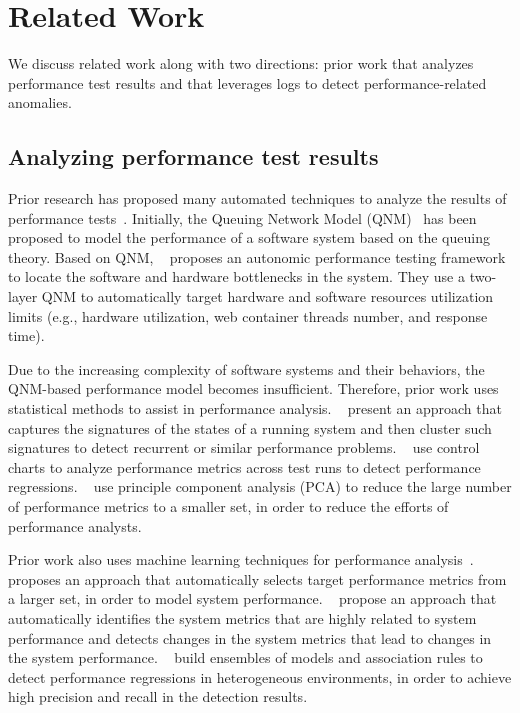 \section{Related Work} \label{sec:relatedwork}
We discuss related work along with two directions: prior work that analyzes performance test results and that leverages logs to detect performance-related anomalies.

\subsection{Analyzing performance test results}
Prior research has proposed many automated techniques to analyze the results of performance tests~\citep{DBLP:conf/icst/GaoJBL16,DBLP:journals/tse/JiangH15}.
Initially, the Queuing Network Model (QNM)~\citep{DBLP:books/daglib/0076254} has been proposed to model the performance of a software system based on the queuing theory. 
Based on QNM, ~\citet{DBLP:conf/icac/BarnaLG11} proposes an autonomic performance testing framework to locate the software and hardware bottlenecks in the system. They use a two-layer QNM to automatically target hardware and software resources utilization limits (e.g., hardware utilization, web container threads number, and response time). 

Due to the increasing complexity of software systems and their behaviors, the QNM-based performance model becomes insufficient.
Therefore, prior work uses statistical methods to assist in performance analysis.
~\citet{DBLP:conf/sosp/CohenZGSKF05} present an approach that captures the signatures of the states of a running system and then cluster such signatures to detect recurrent or similar performance problems. 
~\citet{DBLP:conf/apsec/NguyenAJHNF11,DBLP:conf/wosp/NguyenAJHNF12} use control charts to analyze performance metrics across test runs to detect performance regressions.
~\citet{DBLP:conf/csmr/MalikJAHFH10,DBLP:conf/icse/MalikHH13} use principle component analysis (PCA) to reduce the large number of performance metrics to a smaller set, in order to reduce the efforts of performance analysts.

Prior work also uses machine learning techniques for performance analysis~\citep{DBLP:conf/wosp/ShangHNF15,DBLP:conf/wosp/XiongPZG13,Foo:2015:ICS:2819009.2819034,DBLP:conf/icdm/LimLZFTLDZ14,DBLP:conf/wosp/DidonaQRT15}.
~\citet{DBLP:conf/wosp/ShangHNF15} proposes an approach that automatically selects target performance metrics from a larger set, in order to model system performance. 
~\citet{DBLP:conf/wosp/XiongPZG13} propose an approach that automatically identifies the system metrics that are highly related to system performance and detects changes in the system metrics that lead to changes in the system performance. 
~\citet{Foo:2015:ICS:2819009.2819034} build ensembles of models and association rules to detect performance regressions in heterogeneous environments, in order to achieve high precision and recall in the detection results.

